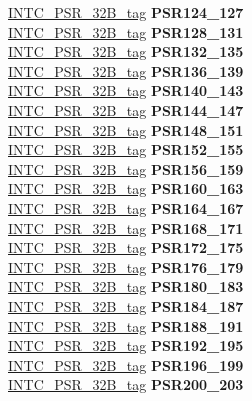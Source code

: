 \begin{DoxyCompactItemize}
\begin{tabbing}
\>\>\mbox{\hyperlink{unionINTC__PSR__32B__tag}{INTC\_PSR\_32B\_tag}} {\bfseries PSR124\_127}\\
\>\>\mbox{\hyperlink{unionINTC__PSR__32B__tag}{INTC\_PSR\_32B\_tag}} {\bfseries PSR128\_131}\\
\>\>\mbox{\hyperlink{unionINTC__PSR__32B__tag}{INTC\_PSR\_32B\_tag}} {\bfseries PSR132\_135}\\
\>\>\mbox{\hyperlink{unionINTC__PSR__32B__tag}{INTC\_PSR\_32B\_tag}} {\bfseries PSR136\_139}\\
\>\>\mbox{\hyperlink{unionINTC__PSR__32B__tag}{INTC\_PSR\_32B\_tag}} {\bfseries PSR140\_143}\\
\>\>\mbox{\hyperlink{unionINTC__PSR__32B__tag}{INTC\_PSR\_32B\_tag}} {\bfseries PSR144\_147}\\
\>\>\mbox{\hyperlink{unionINTC__PSR__32B__tag}{INTC\_PSR\_32B\_tag}} {\bfseries PSR148\_151}\\
\>\>\mbox{\hyperlink{unionINTC__PSR__32B__tag}{INTC\_PSR\_32B\_tag}} {\bfseries PSR152\_155}\\
\>\>\mbox{\hyperlink{unionINTC__PSR__32B__tag}{INTC\_PSR\_32B\_tag}} {\bfseries PSR156\_159}\\
\>\>\mbox{\hyperlink{unionINTC__PSR__32B__tag}{INTC\_PSR\_32B\_tag}} {\bfseries PSR160\_163}\\
\>\>\mbox{\hyperlink{unionINTC__PSR__32B__tag}{INTC\_PSR\_32B\_tag}} {\bfseries PSR164\_167}\\
\>\>\mbox{\hyperlink{unionINTC__PSR__32B__tag}{INTC\_PSR\_32B\_tag}} {\bfseries PSR168\_171}\\
\>\>\mbox{\hyperlink{unionINTC__PSR__32B__tag}{INTC\_PSR\_32B\_tag}} {\bfseries PSR172\_175}\\
\>\>\mbox{\hyperlink{unionINTC__PSR__32B__tag}{INTC\_PSR\_32B\_tag}} {\bfseries PSR176\_179}\\
\>\>\mbox{\hyperlink{unionINTC__PSR__32B__tag}{INTC\_PSR\_32B\_tag}} {\bfseries PSR180\_183}\\
\>\>\mbox{\hyperlink{unionINTC__PSR__32B__tag}{INTC\_PSR\_32B\_tag}} {\bfseries PSR184\_187}\\
\>\>\mbox{\hyperlink{unionINTC__PSR__32B__tag}{INTC\_PSR\_32B\_tag}} {\bfseries PSR188\_191}\\
\>\>\mbox{\hyperlink{unionINTC__PSR__32B__tag}{INTC\_PSR\_32B\_tag}} {\bfseries PSR192\_195}\\
\>\>\mbox{\hyperlink{unionINTC__PSR__32B__tag}{INTC\_PSR\_32B\_tag}} {\bfseries PSR196\_199}\\
\>\>\mbox{\hyperlink{unionINTC__PSR__32B__tag}{INTC\_PSR\_32B\_tag}} {\bfseries PSR200\_203}\\

\end{tabbing}
\end{DoxyCompactItemize}
